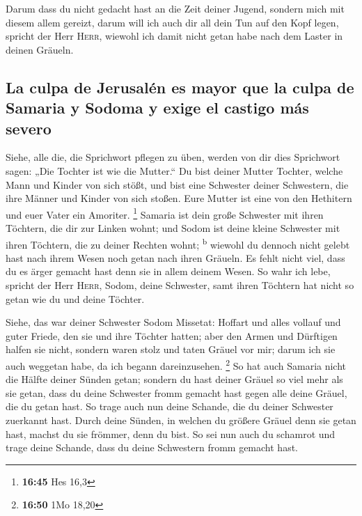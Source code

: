  Darum dass du nicht gedacht hast an die Zeit deiner
Jugend, sondern mich mit diesem allem gereizt, darum will ich auch dir
all dein Tun auf den Kopf legen, spricht der Herr \textsc{Herr}, wiewohl
ich damit nicht getan habe nach dem Laster in deinen Gräueln.

\hypertarget{la-culpa-de-jerusaluxe9n-es-mayor-que-la-culpa-de-samaria-y-sodoma-y-exige-el-castigo-muxe1s-severo}{%
\subsection{La culpa de Jerusalén es mayor que la culpa de Samaria y
Sodoma y exige el castigo más
severo}\label{la-culpa-de-jerusaluxe9n-es-mayor-que-la-culpa-de-samaria-y-sodoma-y-exige-el-castigo-muxe1s-severo}}

 Siehe, alle die, die Sprichwort pflegen zu üben, werden
von dir dies Sprichwort sagen: „Die Tochter ist wie die Mutter.``
 Du bist deiner Mutter Tochter, welche Mann und Kinder
von sich stößt, und bist eine Schwester deiner Schwestern, die ihre
Männer und Kinder von sich stoßen. Eure Mutter ist eine von den
Hethitern und euer Vater ein Amoriter. \footnote{\textbf{16:45} Hes 16,3}
 Samaria ist dein große Schwester mit ihren Töchtern, die
dir zur Linken wohnt; und Sodom ist deine kleine Schwester mit ihren
Töchtern, die zu deiner Rechten wohnt; \textsuperscript{b}
 wiewohl du dennoch nicht gelebt hast nach ihrem Wesen
noch getan nach ihren Gräueln. Es fehlt nicht viel, dass du es ärger
gemacht hast denn sie in allem deinem Wesen.  So wahr ich
lebe, spricht der Herr \textsc{Herr}, Sodom, deine Schwester, samt ihren
Töchtern hat nicht so getan wie du und deine Töchter.

 Siehe, das war deiner Schwester Sodom Missetat: Hoffart
und alles vollauf und guter Friede, den sie und ihre Töchter hatten;
aber den Armen und Dürftigen halfen sie nicht,  sondern
waren stolz und taten Gräuel vor mir; darum ich sie auch weggetan habe,
da ich begann dareinzusehen. \footnote{\textbf{16:50} 1Mo 18,20}
 So hat auch Samaria nicht die Hälfte deiner Sünden
getan; sondern du hast deiner Gräuel so viel mehr als sie getan, dass du
deine Schwester fromm gemacht hast gegen alle deine Gräuel, die du getan
hast.  So trage auch nun deine Schande, die du deiner
Schwester zuerkannt hast. Durch deine Sünden, in welchen du größere
Gräuel denn sie getan hast, machst du sie frömmer, denn du bist. So sei
nun auch du schamrot und trage deine Schande, dass du deine Schwestern
fromm gemacht hast.

